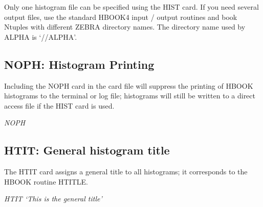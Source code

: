 Only one histogram file can be specified using the HIST card.
If you need several
output files, use the standard HBOOK4 input / output routines and
book
Ntuples with different ZEBRA directory names. The directory name used
by ALPHA is `//ALPHA'.
 
\subsection{\label{sec-HISTP}NOPH: Histogram Printing}
\par
\par Including the NOPH card in the card file will suppress the printing
of HBOOK histograms to the terminal or log file; histograms will still
be
written to a direct access file if the HIST card is used.
\begin{indentlist}{ 2.50cm}{ 2.75cm}
{\it NOPH}\end{indentlist}
 
 
\subsection{\label{sec-HISTT}HTIT: General histogram title}
\par
 
The HTIT card assigns a general title to all histograms;
it corresponds to the HBOOK routine HTITLE.
\begin{indentlist}{ 2.50cm}{ 2.75cm}
{\it HTIT `This is the general title'}\end{indentlist}
 
